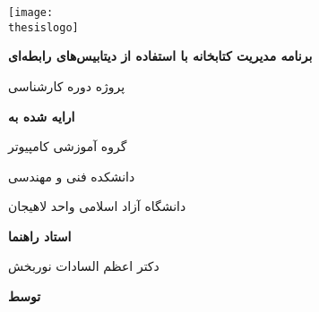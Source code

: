 \newcommand{\firstsize}{\normalsize}
\newcommand{\secondsize}{\large}
\newcommand{\thirdsize}{\Large}
\newcommand{\fourthsize}{\LARGE}

\newcommand{\inlinewidth}{4.0mm}
\newcommand{\outlinewidth}{1.0cm}

\newcommand{\thesislogo}{figs/logo.png}
\newcommand{\thesistitle}{برنامه مدیریت کتابخانه با استفاده از دیتابیس‌های رابطه‌ای}
\newcommand{\thesisgroup}{گروه آموزشی کامپیوتر}
\newcommand{\thesisguide}{دکتر اعظم السادات نوربخش}
\newcommand{\thesisauthor}{حسین اسمعیل‌زاده کومله}
\newcommand{\thesisauthorid}{202982358223}
\newcommand{\thesislesson}{پروژه نرم‌افزار}
\newcommand{\thesisdate}{۱۶ دی ۱۴۰۲}

\begin{titlepage}
	\centering
	\texttt{[image: \\thesislogo]}\par\vspace{1cm}
	{\fourthsize\bfseries\titlefont\thesistitle\par}
		\vspace{\outlinewidth}
		\vspace{\inlinewidth}
	{\thirdsize پروژه دوره کارشناسی\par}
		\vspace{\outlinewidth}
		\vspace{\inlinewidth}
	{\secondsize\bfseries\titlefont ارایه شده به\par}
		\vspace{\inlinewidth}
	{\secondsize\thesisgroup\par}
		\vspace{\inlinewidth}
	{\secondsize دانشکده فنی و مهندسی \par}
		\vspace{\inlinewidth}
	{دانشگاه آزاد اسلامی واحد لاهیجان\par}
		\vspace{\inlinewidth}
		\vspace{\outlinewidth}
	{\thirdsize\bfseries\titlefont استاد راهنما\par}
		\vspace{\inlinewidth}
	{\secondsize\thesisguide\par}
		\vspace{\inlinewidth}
		\vspace{\outlinewidth}
	{\thirdsize\titlefont\bfseries توسط\par}
		\vspace{\inlinewidth}

\end{titlepage}
